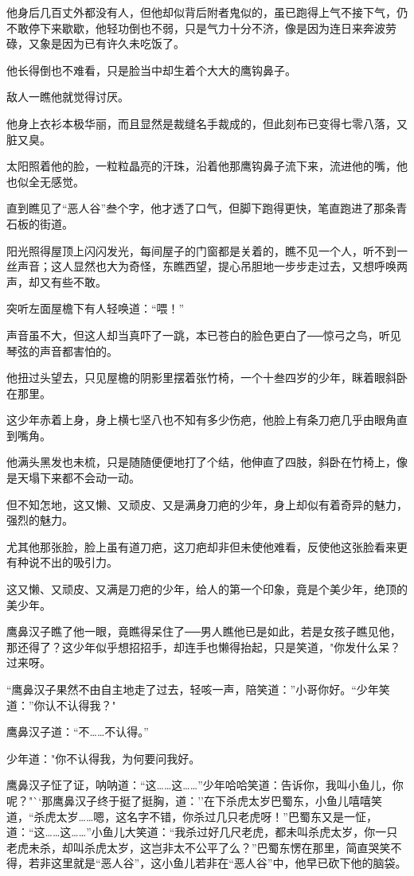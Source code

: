 \documentclass[12pt,oneside]{book}
\begin{document}
他身后几百丈外都没有人，但他却似背后附者鬼似的，虽已跑得上气不接下气，仍不敢停下来歇歇，他轻功倒也不弱，只是气力十分不济，像是因为连日来奔波劳碌，又象是因为已有许久未吃饭了。

他长得倒也不难看，只是脸当中却生着个大大的鹰钩鼻子。

敌人一瞧他就觉得讨厌。

他身上衣衫本极华丽，而且显然是裁缝名手裁成的，但此刻布已变得七零八落，又脏又臭。

太阳照着他的脸，一粒粒晶亮的汗珠，沿着他那鹰钩鼻子流下来，流进他的嘴，他也似全无感觉。

直到瞧见了``恶人谷''叁个字，他才透了口气，但脚下跑得更快，笔直跑进了那条青石板的街道。

阳光照得屋顶上闪闪发光，每间屋子的门窗都是关着的，瞧不见一个人，听不到一丝声音；这人显然也大为奇怪，东瞧西望，提心吊胆地一步步走过去，又想呼唤两声，却又有些不敢。

突听左面屋檐下有人轻唤道：``喂！''

声音虽不大，但这人却当真吓了一跳，本已苍白的脸色更白了──惊弓之鸟，听见琴弦的声音都害怕的。

他扭过头望去，只见屋檐的阴影里摆着张竹椅，一个十叁四岁的少年，眯着眼斜卧在那里。

这少年赤着上身，身上横七坚八也不知有多少伤疤，他脸上有条刀疤几乎由眼角直到嘴角。

他满头黑发也未梳，只是随随便便地打了个结，他伸直了四肢，斜卧在竹椅上，像是天塌下来都不会动一动。

但不知怎地，这又懒、又顽皮、又是满身刀疤的少年，身上却似有着奇异的魅力，强烈的魅力。

尤其他那张脸，脸上虽有道刀疤，这刀疤却非但未使他难看，反使他这张脸看来更有种说不出的吸引力。

这又懒、又顽皮、又满是刀疤的少年，给人的第一个印象，竟是个美少年，绝顶的美少年。

鹰鼻汉子瞧了他一眼，竟瞧得呆住了──男人瞧他已是如此，若是女孩子瞧见他，那还得了？这少年似乎想招招手，却连手也懒得抬起，只是笑道，"你发什么呆？过来呀。

``鹰鼻汉子果然不由自主地走了过去，轻咳一声，陪笑道：''小哥你好。``少年笑道：''你认不认得我？"

鹰鼻汉子道：``不\ldots\ldots 不认得。''

少年道："你不认得我，为何要问我好。

鹰鼻汉子怔了证，呐呐道：``这\ldots\ldots 这\ldots\ldots{}''少年哈哈笑道：告诉你，我叫小鱼儿，你呢？"``那鹰鼻汉子终于挺了挺胸，道：''在下杀虎太岁巴蜀东，小鱼儿嘻嘻笑道，``杀虎太岁\ldots\ldots 嗯，这名字不错，你杀过几只老虎呀！''巴蜀东又是一怔，道：``这\ldots\ldots 这\ldots\ldots{}''小鱼儿大笑道：``我杀过好几尺老虎，都未叫杀虎太岁，你一只老虎未杀，却叫杀虎太岁，这岂非太不公平了么？''巴蜀东愣在那里，简直哭笑不得，若非这里就是``恶人谷''，这小鱼儿若非在``恶人谷''中，他早已砍下他的脑袋。
\end{document}

